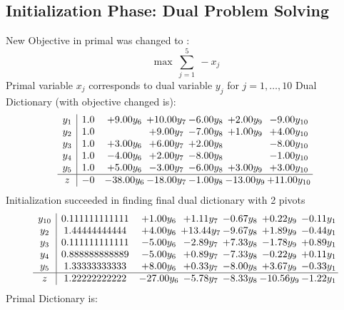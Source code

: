 \documentclass[9pt]{article}
\begin{document}
\subsection{Initialization Phase: Dual Problem Solving}
New Objective in primal was changed to : \[ \max\ \sum_{j=1}^{5}\ - x_j \] 
Primal variable $x_j$ corresponds to dual variable $y_j$ for $j = 1,\ldots,10$
Dual Dictionary (with objective changed is): 
\[\begin{array}{c| c c@{\hskip 2pt} c@{\hskip 2pt} c@{\hskip 2pt} c@{\hskip 2pt} c@{\hskip 2pt} }
 y_{1}   &  1.0 & +  9.00 y_{6} & + 10.00 y_{7} & -6.00 y_{8} & +  2.00 y_{9} & -9.00 y_{10}\\
 y_{2}   &  1.0  &   & +  9.00 y_{7} & -7.00 y_{8} & +  1.00 y_{9} & +  4.00 y_{10}\\
 y_{3}   &  1.0 & +  3.00 y_{6} & +  6.00 y_{7} & +  2.00 y_{8} &   & -8.00 y_{10}\\
 y_{4}   &  1.0 & -4.00 y_{6} & +  2.00 y_{7} & -8.00 y_{8} &   & -1.00 y_{10}\\
 y_{5}   &  1.0 & +  5.00 y_{6} & -3.00 y_{7} & -6.00 y_{8} & +  3.00 y_{9} & +  3.00 y_{10}\\
\hline
z    &  -0 & -38.00 y_{6} & -18.00 y_{7} & -1.00 y_{8} & -13.00 y_{9} & + 11.00 y_{10}\\
\end{array}\]
Initialization succeeded in finding final dual dictionary with 2 pivots
\[\begin{array}{c| c c@{\hskip 2pt} c@{\hskip 2pt} c@{\hskip 2pt} c@{\hskip 2pt} c@{\hskip 2pt} }
 y_{10}   &  0.111111111111 & +  1.00 y_{6} & +  1.11 y_{7} & -0.67 y_{8} & +  0.22 y_{9} & -0.11 y_{1}\\
 y_{2}   &  1.44444444444 & +  4.00 y_{6} & + 13.44 y_{7} & -9.67 y_{8} & +  1.89 y_{9} & -0.44 y_{1}\\
 y_{3}   &  0.111111111111 & -5.00 y_{6} & -2.89 y_{7} & +  7.33 y_{8} & -1.78 y_{9} & +  0.89 y_{1}\\
 y_{4}   &  0.888888888889 & -5.00 y_{6} & +  0.89 y_{7} & -7.33 y_{8} & -0.22 y_{9} & +  0.11 y_{1}\\
 y_{5}   &  1.33333333333 & +  8.00 y_{6} & +  0.33 y_{7} & -8.00 y_{8} & +  3.67 y_{9} & -0.33 y_{1}\\
\hline
z    &  1.22222222222 & -27.00 y_{6} & -5.78 y_{7} & -8.33 y_{8} & -10.56 y_{9} & -1.22 y_{1}\\
\end{array}\]
Primal Dictionary is:
\end{document}
